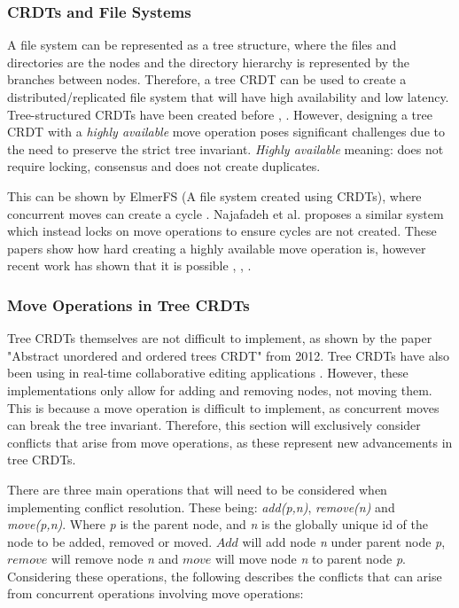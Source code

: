 \documentclass[12pt]{article}
\begin{document}
\subsubsection{CRDTs and File Systems}
A file system can be represented as a tree structure, where the files and directories are the nodes and the directory hierarchy is represented by the branches between nodes. Therefore, a tree CRDT can be used to create a distributed/replicated file system that will have high availability and low latency. Tree-structured CRDTs have been created before \cite{10.1145/2757667.2757683}, \cite{kleppmann2018automerge}. However, designing a tree CRDT with a \textit{highly available} move operation poses significant challenges due to the need to preserve the strict tree invariant. \textit{Highly available} meaning: does not require locking, consensus and does not create duplicates.   \par

This can be shown by ElmerFS (A file system created using CRDTs), where concurrent moves can create a cycle \cite{10.1145/3465332.3470872}. Najafadeh et al. \cite{Najafzadeh0E18} proposes a similar system which instead locks on move operations to ensure cycles are not created. These papers show how hard creating a highly available move operation is, however recent work has shown that it is possible \cite{9563274}, \cite{https://doi.org/10.48550/arxiv.2103.04828}, \cite{https://doi.org/10.48550/arxiv.1805.04263}. \par

\subsubsection{Move Operations in Tree CRDTs}
Tree CRDTs themselves are not difficult to implement, as shown by the paper "Abstract unordered and ordered trees CRDT" \cite{martin2012abstract} from 2012. Tree CRDTs have also been using in real-time collaborative editing applications \cite{5158449}. However, these implementations only allow for adding and removing nodes, not moving them. This is because a move operation is difficult to implement, as concurrent moves can break the tree invariant. Therefore, this section will exclusively consider conflicts that arise from move operations, as these represent new advancements in tree CRDTs. 

There are three main operations that will need to be considered when implementing conflict resolution. These being: \textit{add(p,n)}, \textit{remove(n)} and \textit{move(p,n)}. Where \textit{p} is the parent node, and \textit{n} is the globally unique id of the node to be added, removed or moved. $Add$ will add node \textit{n} under parent node \textit{p}, $remove$ will remove node \textit{n} and $move$ will move node \textit{n} to parent node \textit{p}. Considering these operations, the following describes the conflicts that can arise from concurrent operations involving move operations:
\end{document}
